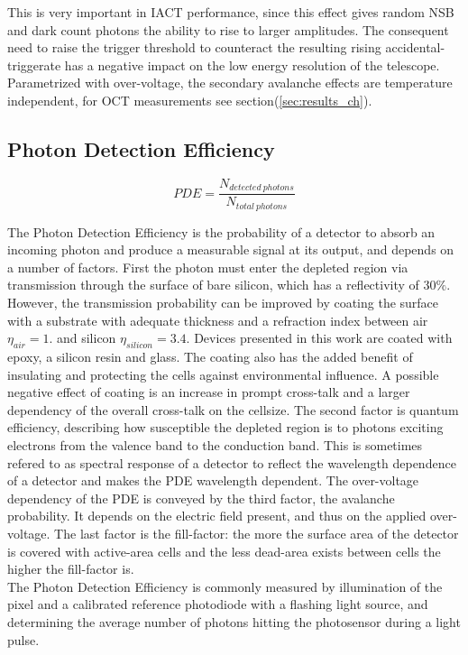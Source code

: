 \documentclass[12pt,article,type=msc,colorback,accentcolor=tud9c]{tudthesis}
\begin{document}
This is very important in IACT performance, since this effect gives random NSB and dark count photons the ability to rise to larger amplitudes. The consequent need to raise the trigger threshold to counteract the resulting rising accidental-triggerate has a negative impact on the low energy resolution of the telescope.\\

Parametrized with over-voltage, the secondary avalanche effects are temperature independent, for OCT measurements see section(\ref{sec:results_ch}).




\subsection{Photon Detection Efficiency}
\label{subsec:SiPMPDE}

\begin{equation}
PDE = \frac{N_{detected\:photons}}{N_{total\:photons}}
\end{equation}

The Photon Detection Efficiency is the probability of a detector to absorb an incoming photon and produce a measurable signal at its output, and depends on a number of factors. First the photon must enter the depleted region via transmission through the surface of bare silicon, which has a reflectivity of 30$\%$. However, the transmission probability can be improved by coating the surface with a substrate with adequate thickness and a refraction index between air $\eta_{air} = 1.$ and silicon $\eta_{silicon} = 3.4$. Devices presented in this work are coated with epoxy, a silicon resin and glass. The coating also has the added benefit of insulating and protecting the cells against environmental influence. A possible negative effect of coating is an increase in prompt cross-talk and a larger dependency of the overall cross-talk on the cellsize. The second factor is quantum efficiency, describing how susceptible the depleted region is to photons exciting electrons from the valence band to the conduction band. This is sometimes refered to as spectral response of a detector to reflect the wavelength dependence of a detector and makes the PDE wavelength dependent. The over-voltage dependency of the PDE is conveyed by the third factor, the avalanche probability. It depends on the electric field present, and thus on the applied over-voltage. The last factor is the fill-factor: the more the surface area of the detector is covered with active-area cells and the less dead-area exists between cells the higher the fill-factor is. \\
The Photon Detection Efficiency is commonly measured by illumination of the pixel and a calibrated reference photodiode with a flashing light source, and determining the average number of photons hitting the photosensor during a light pulse.
\end{document}
